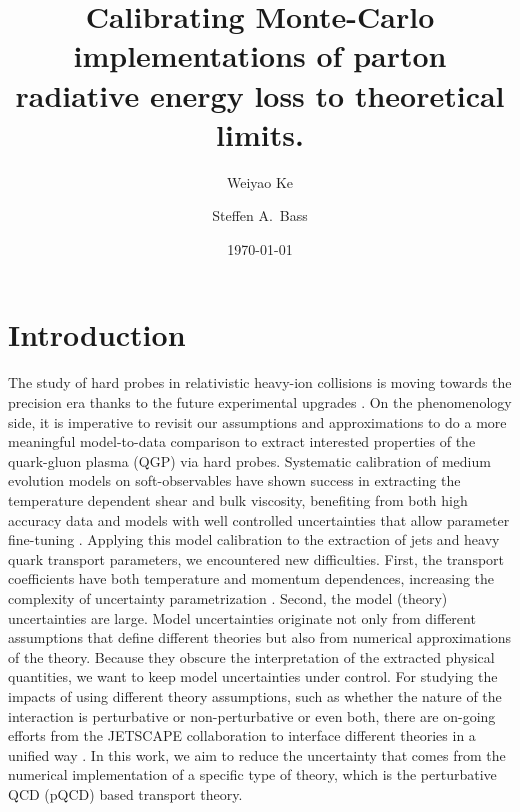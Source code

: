 \documentclass[aps, prc, reprint, amsmath, groupedaddress, nofootinbib]{revtex4-1}
\begin{document}
\title{Calibrating Monte-Carlo implementations of parton radiative energy loss to theoretical limits.}
\author{Weiyao Ke}
\author{Steffen A.\ Bass}
\date{\today}
\maketitle 

\section{Introduction}
The study of hard probes in relativistic heavy-ion collisions is moving towards the precision era thanks to the future experimental upgrades \cite{ATLAS-Collaboration:2012iwa,Abelevetal:2014dna,STAR:upgrade-hf,Adare:2015kwa,CMS:2017dec}.
On the phenomenology side, it is imperative to revisit our assumptions and approximations to do a more meaningful model-to-data comparison to extract interested properties of the quark-gluon plasma (QGP) via hard probes.
Systematic calibration of medium evolution models on soft-observables have shown success in extracting the temperature dependent shear and bulk viscosity, benefiting from both high accuracy data and models with well controlled uncertainties that allow parameter fine-tuning \cite{Bernhard:2016tnd, Bernhard:2018hnz}.
Applying this model calibration to the extraction of jets and heavy quark transport parameters, we encountered new difficulties. 
First, the transport coefficients have both temperature and momentum dependences, increasing the complexity of uncertainty parametrization \cite{Xu:2017obm}.
Second, the model (theory) uncertainties are large. 
Model uncertainties originate not only from different assumptions that define different theories \cite{CaronHuot:2010bp, Rapp:2018qla} but also from numerical approximations of the theory.
Because they obscure the interpretation of the extracted physical quantities, we want to keep model uncertainties under control.
For studying the impacts of using different theory assumptions, such as whether the nature of the interaction is perturbative or non-perturbative or even both, there are on-going efforts from the JETSCAPE collaboration to interface different theories in a unified way \cite{Cao:2017zih, Kauder:2018cdt}.
In this work, we aim to reduce the uncertainty that comes from the numerical implementation of a specific type of theory, which is the perturbative QCD (pQCD) based transport theory.
\end{document}
